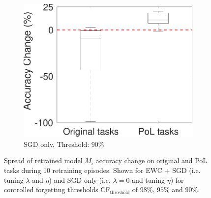 \begin{figure}[!t]
\begin{subfigure}{.3\textwidth}
        \includegraphics[width=1\textwidth]{../other/figures/90-124-4_v1.pdf}
        \caption{SGD only, Threshold: $90\%$}
        \label{90_box_SGD}
    \end{subfigure}
    \caption{Spread of retrained model $M_i$ accuracy change on original and PoL tasks during 10 retraining episodes. Shown for EWC + SGD (i.e. tuning $\lambda$ and $\eta$) and SGD only (i.e. $\lambda = 0$ and tuning $\eta$) for controlled forgetting thresholds CF$_{\text{threshold}}$ of $98\%$, $95\%$ and $90\%$. }
    \label{fig:box}
\end{figure}


